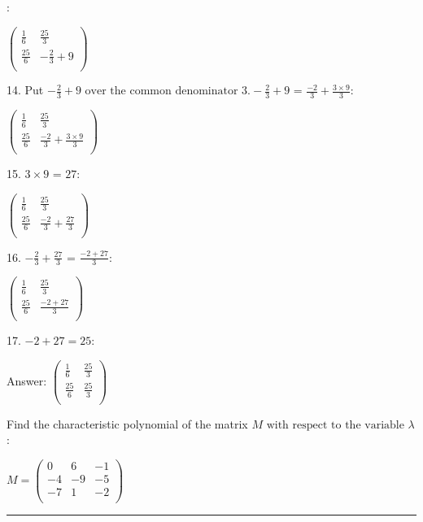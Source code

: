 \documentclass{article}
\begin{document}
:

$\left(
\begin{array}{cc}
\frac{1}{6} & \frac{25}{3} \\
 \frac{25}{6} & -\frac{2}{3}+9 \\
\end{array}
\right)$

14. Put $-\frac{2}{3}+9\text{ over the common denominator }3. -\frac{2}{3}+9\text{ = }\frac{-2}{3}+\frac{3\times 9}{3}$:

$\left(
\begin{array}{cc}
\frac{1}{6} & \frac{25}{3} \\
 \frac{25}{6} & \frac{-2}{3}+\frac{3\times 9}{3} \\
\end{array}
\right)$

15. $3\times 9\text{ = }27:$

$\left(
\begin{array}{cc}
\frac{1}{6} & \frac{25}{3} \\
 \frac{25}{6} & \frac{-2}{3}+\frac{27}{3} \\
\end{array}
\right)$

16. $-\frac{2}{3}+\frac{27}{3}\text{ = }\frac{-2+27}{3}$:

$\left(
\begin{array}{cc}
\frac{1}{6} & \frac{25}{3} \\
 \frac{25}{6} & \frac{-2+27}{3} \\
\end{array}
\right)$

17. $-2+27=25:$

Answer: $\left(
\begin{array}{cc}
\frac{1}{6} & \frac{25}{3} \\
 \frac{25}{6} & \frac{25}{3} \\
\end{array}
\right)$

\pagebreak

Find the characteristic polynomial of the matrix $M\text{ with respect to the variable }\lambda$ :

$M=\left(
    \begin{array}{ccc}
0  & 6  & -1 \\
        -4 & -9 & -5 \\
        -7 & 1  & -2 \\
      \end{array}
    \right)$

\hrule
\end{document}
